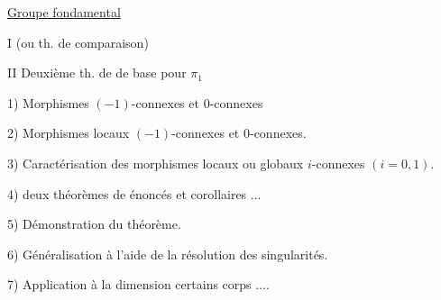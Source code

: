 \uline{Groupe fondamental}

I   (ou th. de comparaison)

II Deuxième th. de  de base pour $\pi_1$

1) Morphismes $(-1)$-connexes et $0$-connexes

2) Morphismes locaux $(-1)$-connexes et $0$-connexes.

3)  Caractérisation des morphismes locaux ou globaux $i$-connexes $(i=0,1)$.

4)  deux théorèmes de   énoncés et corollaires ...

5)  Démonstration du théorème.

6) Généralisation à l'aide de la résolution des singularités.

7) Application à la dimension   certains corps ....

